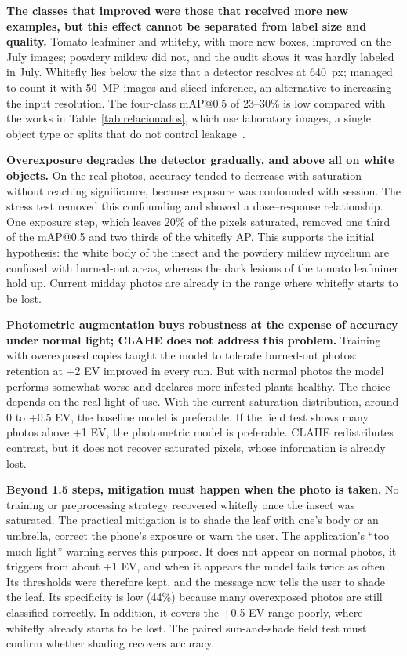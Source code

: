 \documentclass[sensors,article,submit,pdftex,moreauthors]{Definitions/mdpi}
\begin{document}
\textbf{The classes that improved were those that received more new examples, but this effect cannot be separated from label size and quality.} Tomato leafminer and whitefly, with more new boxes, improved on the July images; powdery mildew did not, and the audit shows it was hardly labeled in July. Whitefly lies below the size that a detector resolves at 640~px; \citet{Zhao2025} managed to count it with 50~MP images and sliced inference, an alternative to increasing the input resolution. The four-class mAP@0.5 of 23--30\% is low compared with the works in Table~\ref{tab:relacionados}, which use laboratory images, a single object type or splits that do not control leakage~\cite{Gerz2025}.

\textbf{Overexposure degrades the detector gradually, and above all on white objects.} On the real photos, accuracy tended to decrease with saturation without reaching significance, because exposure was confounded with session. The stress test removed this confounding and showed a dose--response relationship. One exposure step, which leaves 20\% of the pixels saturated, removed one third of the mAP@0.5 and two thirds of the whitefly AP. This supports the initial hypothesis: the white body of the insect and the powdery mildew mycelium are confused with burned-out areas, whereas the dark lesions of the tomato leafminer hold up. Current midday photos are already in the range where whitefly starts to be lost.

\textbf{Photometric augmentation buys robustness at the expense of accuracy under normal light; CLAHE does not address this problem.} Training with overexposed copies taught the model to tolerate burned-out photos: retention at +2 EV improved in every run. But with normal photos the model performs somewhat worse and declares more infested plants healthy. The choice depends on the real light of use. With the current saturation distribution, around 0 to +0.5 EV, the baseline model is preferable. If the field test shows many photos above +1 EV, the photometric model is preferable. CLAHE redistributes contrast, but it does not recover saturated pixels, whose information is already lost.

\textbf{Beyond 1.5 steps, mitigation must happen when the photo is taken.} No training or preprocessing strategy recovered whitefly once the insect was saturated. The practical mitigation is to shade the leaf with one's body or an umbrella, correct the phone's exposure or warn the user. The application's ``too much light'' warning serves this purpose. It does not appear on normal photos, it triggers from about +1 EV, and when it appears the model fails twice as often. Its thresholds were therefore kept, and the message now tells the user to shade the leaf. Its specificity is low (44\%) because many overexposed photos are still classified correctly. In addition, it covers the +0.5 EV range poorly, where whitefly already starts to be lost. The paired sun-and-shade field test must confirm whether shading recovers accuracy.
\end{document}
